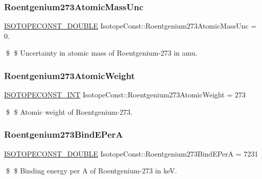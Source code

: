 \subsubsection{\texorpdfstring{Roentgenium273\+Atomic\+Mass\+Unc}{Roentgenium273AtomicMassUnc}}
{\footnotesize\ttfamily \mbox{\hyperlink{group___isotope_const-_macros_ga8f45a7272ce02c0b4c65c44636ed719a}{I\+S\+O\+T\+O\+P\+E\+C\+O\+N\+S\+T\+\_\+\+D\+O\+U\+B\+LE}} Isotope\+Const\+::\+Roentgenium273\+Atomic\+Mass\+Unc = 0.}

\$ \$ Uncertainty in atomic mass of Roentgenium-\/273 in amu. \mbox{\label{group___isotope_const-_roentgenium-_rg273_gac018cb3b35554b4c6cb079f507b7bd00}} 
\subsubsection{\texorpdfstring{Roentgenium273\+Atomic\+Weight}{Roentgenium273AtomicWeight}}
{\footnotesize\ttfamily \mbox{\hyperlink{group___isotope_const-_macros_ga5f18360b3e99483a35c32d789e62621c}{I\+S\+O\+T\+O\+P\+E\+C\+O\+N\+S\+T\+\_\+\+I\+NT}} Isotope\+Const\+::\+Roentgenium273\+Atomic\+Weight = 273}

\$ \$ Atomic weight of Roentgenium-\/273. \mbox{\label{group___isotope_const-_roentgenium-_rg273_ga61e51cc5c5a4ce4517429850e7a4a6e2}} 
\subsubsection{\texorpdfstring{Roentgenium273\+Bind\+E\+PerA}{Roentgenium273BindEPerA}}
{\footnotesize\ttfamily \mbox{\hyperlink{group___isotope_const-_macros_ga8f45a7272ce02c0b4c65c44636ed719a}{I\+S\+O\+T\+O\+P\+E\+C\+O\+N\+S\+T\+\_\+\+D\+O\+U\+B\+LE}} Isotope\+Const\+::\+Roentgenium273\+Bind\+E\+PerA = 7231}

\$ \$ Binding energy per A of Roentgenium-\/273 in keV. \mbox{\label{group___isotope_const-_roentgenium-_rg273_ga1bff3b1143d139df70bf273a6ed52ea9}} 
